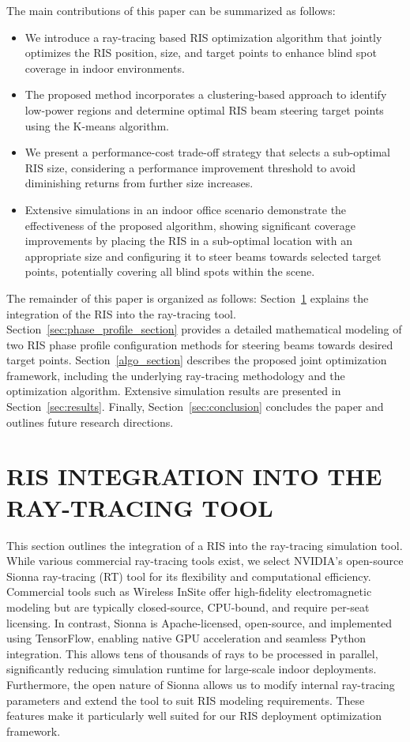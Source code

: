 \documentclass{IEEEoj}
\begin{document}
The main contributions of this paper can be summarized as follows:
\begin{itemize}
	\item We introduce a ray-tracing based RIS optimization algorithm that jointly optimizes the RIS position, size, and target points to enhance blind spot coverage in indoor environments.
	\item The proposed method incorporates a clustering-based approach to identify low-power regions and determine optimal RIS beam steering target points using the K-means algorithm.
	\item We present a performance-cost trade-off strategy that selects a sub-optimal RIS size, considering a performance improvement threshold to avoid diminishing returns from further size increases.
	\item Extensive simulations in an indoor office scenario demonstrate the effectiveness of the proposed algorithm, showing significant coverage improvements by placing the RIS in a sub-optimal location with an appropriate size and configuring it to steer beams towards selected target points, potentially covering all blind spots within the scene.
\end{itemize}

The remainder of this paper is organized as follows: Section~\ref{sec:ris_integration_into_RT} explains the integration of the RIS into the ray-tracing tool. Section~\ref{sec:phase_profile_section} provides a detailed mathematical modeling of two RIS phase profile configuration methods for steering beams towards desired target points. Section~\ref{algo_section} describes the proposed joint optimization framework, including the underlying ray-tracing methodology and the optimization algorithm. Extensive simulation results are presented in Section~\ref{sec:results}. Finally, Section~\ref{sec:conclusion} concludes the paper and outlines future research directions.

\section{RIS INTEGRATION INTO THE RAY-TRACING TOOL} \label{sec:ris_integration_into_RT}
This section outlines the integration of a RIS into the ray-tracing simulation tool. While various commercial ray-tracing tools exist, we select NVIDIA’s open-source Sionna ray-tracing (RT) tool \cite{sionna} for its flexibility and computational efficiency. Commercial tools such as Wireless InSite \cite{wireless_insite} offer high-fidelity electromagnetic modeling but are typically closed-source, CPU-bound, and require per-seat licensing. In contrast, Sionna is Apache-licensed, open-source, and implemented using TensorFlow, enabling native GPU acceleration and seamless Python integration. This allows tens of thousands of rays to be processed in parallel, significantly reducing simulation runtime for large-scale indoor deployments. Furthermore, the open nature of Sionna allows us to modify internal ray-tracing parameters and extend the tool to suit RIS modeling requirements. These features make it particularly well suited for our RIS deployment optimization framework.
\end{document}
